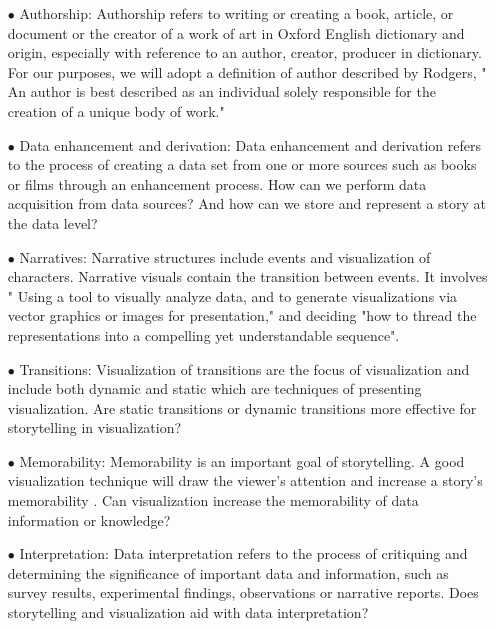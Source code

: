 \documentclass{egpubl}
\begin{document}
\begin{enumerate}
	\item[$\bullet$] Authorship: Authorship refers to writing or creating a book, article, or document or the creator of a work of art in Oxford English dictionary\cite{authoship2} and origin, especially with reference to an author, creator, producer in dictionary\cite{authoship1}. For our purposes, we will adopt a definition of author described by Rodgers\cite{rodgers2011}, " An author is best described as an individual solely responsible for the creation of a unique body of work."
	\item[$\bullet$] Data enhancement and derivation: Data enhancement and derivation refers to the process of creating a data set from one or more sources such as books or films through an enhancement process. How can we perform data acquisition from data sources? And how can we store and represent a story at the data level?
	\item[$\bullet$] Narratives: Narrative structures include events and visualization of characters. Narrative visuals contain the transition between events. It involves " Using a tool to visually analyze data, and to generate visualizations via vector graphics or images for presentation," and deciding "how to thread the representations into a compelling yet understandable sequence"\cite{hullman2013deeper}.
	
	\item[$\bullet$] Transitions: Visualization of transitions are the focus of visualization and include both dynamic and static which are techniques of presenting visualization. Are static transitions or dynamic transitions more effective for storytelling in visualization?
	
	\item[$\bullet$]Memorability: Memorability is an important goal of storytelling. A good visualization technique will draw the viewer's attention and increase a story's memorability \cite{bateman}. Can visualization increase the memorability of data information or knowledge?
	
	\item[$\bullet$] Interpretation: Data interpretation refers to the process of critiquing and determining the significance of important data and information, such as survey results, experimental findings, observations or narrative reports. Does storytelling and visualization aid with data interpretation? 
	
\end{enumerate}
\end{document}
